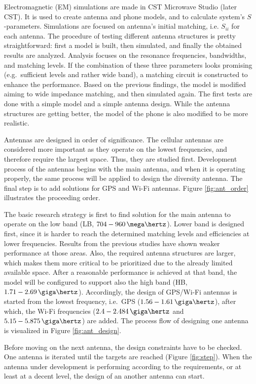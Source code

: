 Electromagnetic (EM) simulations are made in CST Microwave Studio \cite{cst} (later CST). It is used to create antenna and phone models, and to calculate system's $S$-parameters. Simulations are focused on antenna's initial matching, i.e. $S_{ii}$ for each antenna. The procedure of testing different antenna structures is pretty straightforward: first a model is built, then simulated, and finally the obtained results are analyzed. Analysis focuses on the resonance frequencies, bandwidths, and matching levels. If the combination of these three parameters looks promising (e.g.\ sufficient levels and rather wide band), a matching circuit is constructed to enhance the performance. Based on the previous findings, the model is modified aiming to wide impedance matching, and then simulated again. The first tests are done with a simple model and a simple antenna design. While the antenna structures are getting better, the model of the phone is also modified to be more realistic.

Antennas are designed in order of significance. The cellular antennas are considered more important as they operate on the lowest frequencies, and therefore require the largest space. Thus, they are studied first. Development process of the antennas begins with the main antenna, and when it is operating properly, the same process will be applied to design the diversity antenna. The final step is to add solutions for GPS and Wi-Fi antennas. Figure \ref{fig:ant_order} illustrates the proceeding order. 

The basic research strategy is first to find solution for the main antenna to operate on the low band (LB, $704-960\,\mega\hertz$). Lower band is designed first, since it is harder to reach the determined matching levels and efficiencies at lower frequencies. Results from the previous studies have shown weaker performance at those areas. Also, the required antenna structures are larger, which makes them more critical to be prioritized due to the already limited available space. After a reasonable performance is achieved at that band, the model will be configured to support also the high band (HB, $1.71-2.69\,\giga\hertz$). Accordingly, the design of GPS/Wi-Fi antennas is started from the lowest frequency, i.e.\ GPS ($1.56-1.61\,\giga\hertz$), after which, the Wi-Fi frequencies ($2.4-2.484\,\giga\hertz$ and $5.15-5.875\,\giga\hertz$) are added. The process flow of designing one antenna is visualized in Figure \ref{fig:ant_design}.

Before moving on the next antenna, the design constraints have to be checked. One antenna is iterated until the targets are reached (Figure \ref{fig:step}). When the antenna under development is performing according to the requirements, or at least at a decent level, the design of an another antenna can start.


